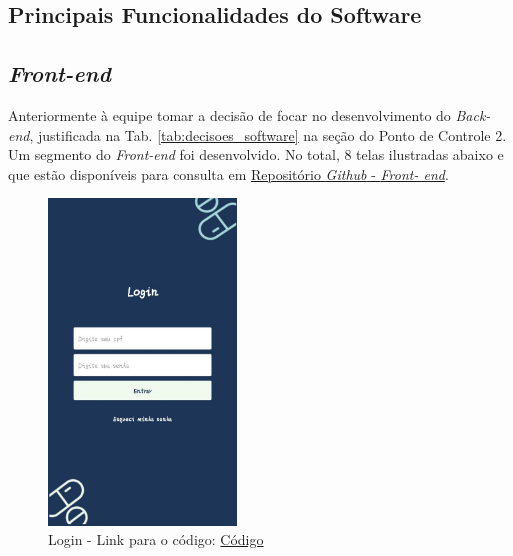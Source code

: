 \begin{apendicesenv}
\chapter{Principais Funcionalidades do Software}\label{principais_funcionalidades_software}
\section{\textit{Front-end}}

Anteriormente à equipe tomar a decisão de focar no desenvolvimento do \textit{Back-end}, justificada na Tab. \ref{tab:decisoes_software} na seção do Ponto de Controle 2. Um segmento do \textit{Front-end} foi desenvolvido. No total, 8 telas ilustradas abaixo e que estão disponíveis para consulta em \href{https://github.com/PillWatcher/pillwatcher-dpf-service/tree/dev/components}{Repositório \textit{Github} - \textit{Front- end}}.




\begin{figure}[H]
    \centering
    \includegraphics[width=5cm]{figuras/software/telas_frontend/front_login.jpg}
    \caption{Login - Link para o código: \href{https://github.com/PillWatcher/pillwatcher-dpf-service/blob/dev/components/login.js}{Código}}
    \label{fig:login}
\end{figure}


\end{apendicesenv}
